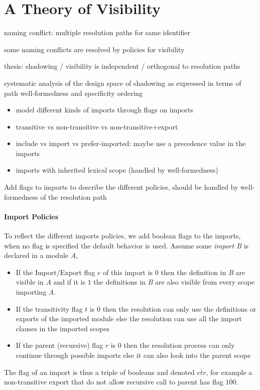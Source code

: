 \section{A Theory of Visibility}

naming conflict: multiple resolution paths for same identifier

some naming conflicts are resolved by policies for visibility 

thesis: shadowing / visibility is independent / orthogonal to resolution paths

systematic analysis of the design space of shadowing as expressed in terms of path well-formedness and specificity ordering
\begin{itemize}
 \item  model different kinds of imports through flags on imports
\item transitive vs non-transitive vs non-transitive+export
\item include vs import vs prefer-imported: maybe use a precedence value in the imports
\item imports with inherited lexical scope (handled by well-formedness)
\end{itemize}

Add flags to imports to describe the different policies, should be handled by well-formedness of the resolution path

\newcommand{\flag}[1]{\overline{#1}}

\paragraph{Import Policies}
To reflect the different imports policies, we add boolean flags to the imports,
when no flag is specified the default behavior is used.
Assume some \emph{import B} is declared in a module {\it A},
\begin{itemize}
 \item If the Import/Export flag $e$ of this import is $0$ then the definition in {\it B} are visible in $A$ and if it is $1$ the definitions
  in {\it B} are also visible from every scope importing \emph{A}.
 \item If the transitivity flag $t$ is $0$ then the resolution can only use the definitions or exports of the imported module else
  the resolution can use all the import clauses in the imported scopes
 \item If the parent (recursive) flag $r$ is $0$ then the resolution process can only continue through possible imports else it 
  can also look into the parent scope
\end{itemize}
The flag of an import is thus a triple of booleans and denoted $\flag{etr}$, for example a non-transitive export that do not allow recursive call
to parent has flag $\flag{100}$.


